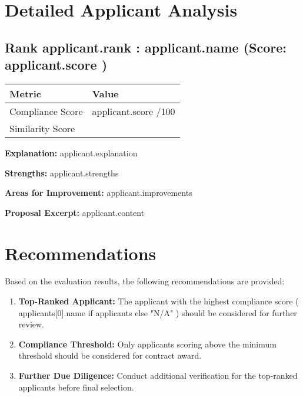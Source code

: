 \documentclass[12pt,a4paper]{article}
\begin{document}
{{\section*{Detailed Applicant Analysis}

{%
\subsection*{Rank {{ applicant.rank }}: {{ applicant.name }} (Score: {{ applicant.score }})}

\begin{table}[H]
\centering
\begin{tabularx}{\textwidth}{|l|X|}
\hline
\textbf{Metric} & \textbf{Value} \\
\hline
Compliance Score & {{ applicant.score }}/100 \\
Similarity Score & {{ "%
\hline
\end{tabularx}
\end{table}

\textbf{Explanation:} {{ applicant.explanation }}

\textbf{Strengths:} {{ applicant.strengths }}

\textbf{Areas for Improvement:} {{ applicant.improvements }}

\textbf{Proposal Excerpt:} {{ applicant.content }}

\newpage
{%

\section*{Recommendations}

Based on the evaluation results, the following recommendations are provided:

\begin{enumerate}
    \item \textbf{Top-Ranked Applicant:} The applicant with the highest compliance score ({{ applicants[0].name if applicants else "N/A" }}) should be considered for further review.
    \item \textbf{Compliance Threshold:} Only applicants scoring above the minimum threshold should be considered for contract award.
    \item \textbf{Further Due Diligence:} Conduct additional verification for the top-ranked applicants before final selection.
\end{enumerate}

}}}}
\end{document}
